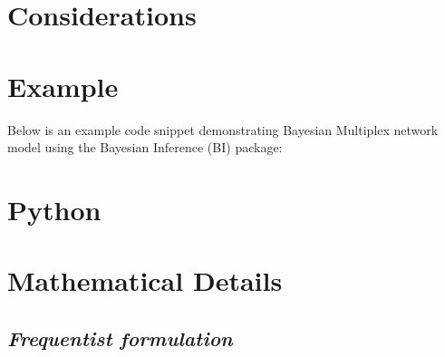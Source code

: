 \documentclass[
  letterpaper,
  DIV=11,
  numbers=noendperiod]{scrreprt}
\newenvironment{Shaded}{\begin{snugshade}}{\end{snugshade}}
\begin{document}
\section{Considerations}\label{considerations-21}

\begin{tcolorbox}[enhanced jigsaw, toptitle=1mm, opacityback=0, titlerule=0mm, breakable, bottomrule=.15mm, colframe=quarto-callout-caution-color-frame, arc=.35mm, coltitle=black, left=2mm, opacitybacktitle=0.6, leftrule=.75mm, toprule=.15mm, rightrule=.15mm, bottomtitle=1mm, colbacktitle=quarto-callout-caution-color!10!white, title=\textcolor{quarto-callout-caution-color}{\faFire}\hspace{0.5em}{Caution}, colback=white]

\end{tcolorbox}

\section{Example}\label{example-20}

Below is an example code snippet demonstrating Bayesian Multiplex
network model using the Bayesian Inference (BI) package:

\section{Python}

\begin{Shaded}
\begin{Highlighting}[]

\end{Highlighting}
\end{Shaded}

\begin{Shaded}
\begin{Highlighting}[]

\end{Highlighting}
\end{Shaded}

\section{Mathematical Details}\label{mathematical-details-22}

\subsection{\texorpdfstring{\emph{Frequentist
formulation}}{Frequentist formulation}}\label{frequentist-formulation-11}
\end{document}
